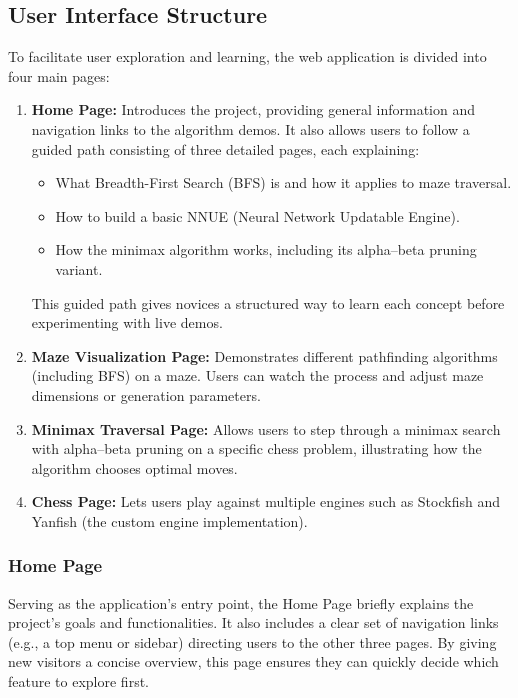 \documentclass[12pt,a4paper]{article}
\begin{document}
\subsection{User Interface Structure}
To facilitate user exploration and learning, the web application is divided into four main pages:
\begin{enumerate}
  \item \textbf{Home Page:} Introduces the project, providing general information and navigation links to the algorithm demos. It also allows users to follow a guided path consisting of three detailed pages, each explaining:
    \begin{itemize}
      \item What Breadth-First Search (BFS) is and how it applies to maze traversal.
      \item How to build a basic NNUE (Neural Network Updatable Engine).
      \item How the minimax algorithm works, including its alpha--beta pruning variant.
    \end{itemize}
    This guided path gives novices a structured way to learn each concept before experimenting with live demos.
  \item \textbf{Maze Visualization Page:} Demonstrates different pathfinding algorithms (including BFS) on a maze. Users can watch the process and adjust maze dimensions or generation parameters.
  \item \textbf{Minimax Traversal Page:} Allows users to step through a minimax search with alpha--beta pruning on a specific chess problem, illustrating how the algorithm chooses optimal moves.
  \item \textbf{Chess Page:} Lets users play against multiple engines such as Stockfish and Yanfish (the custom engine implementation).
\end{enumerate}


\subsubsection{Home Page}
Serving as the application's entry point, the Home Page briefly explains the project's goals and functionalities. It also includes a clear set of navigation links (e.g., a top menu or sidebar) directing users to the other three pages. By giving new visitors a concise overview, this page ensures they can quickly decide which feature to explore first.
\end{document}

